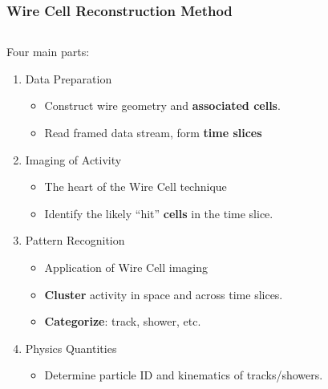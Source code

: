 \documentclass[xcolor=dvipsnames]{beamer}
\begin{document}
\begin{frame}
\end{frame}

\begin{frame}[fragile]
  \frametitle{Wire Cell Reconstruction Method}
  \begin{columns}
    \begin{column}{0.7\textwidth}
      Four main parts:
      \begin{enumerate}
      \item<2> Data Preparation
        \begin{itemize}        \scriptsize
        \item Construct wire geometry and  \textbf{associated cells}.
        \item Read framed data stream, form \textbf{time slices}
        \end{itemize}
      \item<3> Imaging of Activity
        \begin{itemize}        \scriptsize
        \item The heart of the Wire Cell technique
        \item Identify the likely ``hit'' \textbf{cells} in the time slice.
        \end{itemize}
      \item<4> Pattern Recognition 
        \begin{itemize}         \scriptsize
        \item Application of Wire Cell imaging
        \item \textbf{Cluster} activity in space and across time slices.
        \item \textbf{Categorize}: track, shower, etc.
        \end{itemize}
      \item<5> Physics Quantities
        \begin{itemize}         \scriptsize
        \item Determine particle ID and kinematics of tracks/showers.
        \end{itemize}
      \end{enumerate}
    \end{column}
    \begin{column}{0.3\textwidth}
      \begin{center}
        \vspace{-10mm}
        \resizebox{!}{\textheight}{}
      \end{center}
    \end{column}
  \end{columns}

\end{frame}
\end{document}
